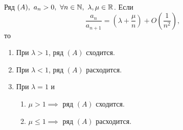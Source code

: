 \begin{theorem}
    Ряд $(A), \ a_n > 0, \ \forall n \in \mathbb{N}, \ \lambda, \mu \in \mathbb{R}$. Если
    \[
        \frac{a_n}{a_{n+1}} = \left(\lambda + \frac{\mu}{n}\right) + O\left(\frac{1}{n^2}\right),
    \]
    то
    \begin{enumerate}
        \item При $\lambda > 1$, ряд $(A)$ сходится.
        \item При $\lambda < 1$, ряд $(A)$ расходится.
        \item При $\lambda = 1$ и \begin{enumerate}
                  \item $\mu > 1 \implies$ ряд $(A)$ сходится.
                  \item $\mu \leqslant 1 \implies$ ряд $(A)$ расходится.
              \end{enumerate}
    \end{enumerate}
\end{theorem}

